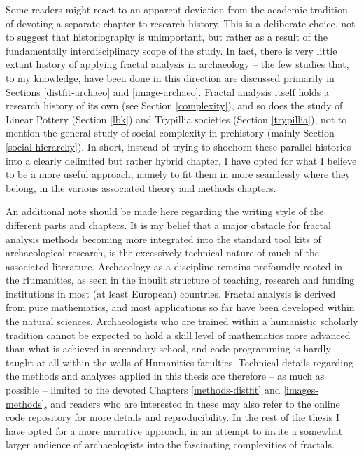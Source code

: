 \documentclass[
  12pt,
  a4paper, twoside]{book}
\begin{document}
Some readers might react to an apparent deviation from the academic tradition of devoting a separate chapter to research history. This is a deliberate choice, not to suggest that historiography is unimportant, but rather as a result of the fundamentally interdisciplinary scope of the study. In fact, there is very little extant history of applying fractal analysis in archaeology -- the few studies that, to my knowledge, have been done in this direction are discussed primarily in Sections \ref{distfit-archaeo} and \ref{image-archaeo}. Fractal analysis itself holds a research history of its own (see Section \ref{complexity}), and so does the study of Linear Pottery (Section \ref{lbk}) and Trypillia societies (Section \ref{trypillia}), not to mention the general study of social complexity in prehistory (mainly Section \ref{social-hierarchy}). In short, instead of trying to shoehorn these parallel histories into a clearly delimited but rather hybrid chapter, I have opted for what I believe to be a more useful approach, namely to fit them in more seamlessly where they belong, in the various associated theory and methods chapters.

An additional note should be made here regarding the writing style of the different parts and chapters. It is my belief that a major obstacle for fractal analysis methods becoming more integrated into the standard tool kits of archaeological research, is the excessively technical nature of much of the associated literature. Archaeology as a discipline remains profoundly rooted in the Humanities, as seen in the inbuilt structure of teaching, research and funding institutions in most (at least European) countries. Fractal analysis is derived from pure mathematics, and most applications so far have been developed within the natural sciences. Archaeologists who are trained within a humanistic scholarly tradition cannot be expected to hold a skill level of mathematics more advanced than what is achieved in secondary school, and code programming is hardly taught at all within the walls of Humanities faculties. Technical details regarding the methods and analyses applied in this thesis are therefore -- as much as possible -- limited to the devoted Chapters \ref{methods-distfit} and \ref{images-methods}, and readers who are interested in these may also refer to the online code repository for more details and reproducibility. In the rest of the thesis I have opted for a more narrative approach, in an attempt to invite a somewhat larger audience of archaeologists into the fascinating complexities of fractals.
\end{document}
